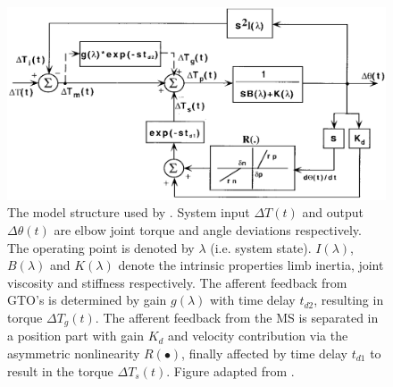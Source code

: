 

\begin{figure}[t]
    \centering
    \includegraphics[width=\linewidth]{Figures/models_assumptions/model_zhang_1997.png}
    \caption{The model structure used by \citeauthor{zhang_simultaneous_1997}. System input $\Delta T(t)$ and output $\Delta \theta (t)$ are elbow joint torque and angle deviations respectively. The operating point is denoted by $\lambda$ (i.e. system state). $I(\lambda)$, $B(\lambda)$ and $K(\lambda)$ denote the intrinsic properties limb inertia, joint viscosity and stiffness respectively. The afferent feedback from GTO's is determined by gain $g(\lambda)$ with time delay $t_{d2}$, resulting in torque $\Delta T_g (t)$. The afferent feedback from the MS is separated in a position part with gain $K_d$ and velocity contribution via the asymmetric nonlinearity $R( \bullet )$, finally affected by time delay $t_{d1}$ to result in the torque $\Delta T_s (t)$. Figure adapted from \citet{zhang_simultaneous_1997}.}
    \label{fig:model_zhang_1997}
\end{figure}




